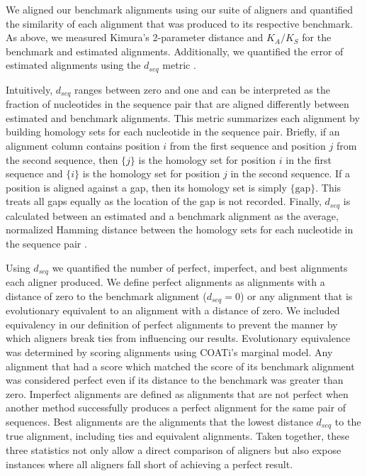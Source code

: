 \documentclass[12pt,letterpaper]{article}
\begin{document}
We aligned our benchmark alignments using our suite of aligners and quantified the similarity of each alignment that was produced to its respective benchmark. As above, we measured Kimura's 2-parameter distance \citep{kimura1980simple} and $K_A/K_S$ \citep{ka_ks_li_1993} for the benchmark and estimated alignments. Additionally, we quantified the error of estimated alignments using the $d_{seq}$ metric \citep{metrics_blackburne_whelan_2011}.

Intuitively, $d_{seq}$ ranges between zero and one and can be interpreted as the fraction of nucleotides in the sequence pair that are aligned differently between estimated and benchmark alignments. This metric summarizes each alignment by building homology sets for each nucleotide in the sequence pair. Briefly, if an alignment column contains position $i$ from the first sequence and position $j$ from the second sequence, then $\{j\}$ is the homology set for position $i$ in the first sequence and $\{i\}$ is the homology set for position $j$ in the second sequence. If a position is aligned against a gap, then its homology set is simply $\{\text{gap}\}$. This treats all gaps equally as the location of the gap is not recorded. Finally, $d_{seq}$ is calculated  between an estimated and a benchmark alignment as the average, normalized Hamming distance between the homology sets for each nucleotide in the sequence pair \citep{metrics_blackburne_whelan_2011}.

Using $d_{seq}$ we quantified the number of perfect, imperfect, and best alignments each aligner produced. We define perfect alignments as alignments with a distance of zero to the benchmark alignment ($d_{seq} = 0$) or any alignment that is evolutionary equivalent to an alignment with a distance of zero. We included equivalency in our definition of perfect alignments to prevent the manner by which aligners break ties from influencing our results. Evolutionary equivalence was determined by scoring alignments using COATi's marginal model. Any alignment that had a score which matched the score of its benchmark alignment was considered perfect even if its distance to the benchmark was greater than zero.
%
Imperfect alignments are defined as alignments that are not perfect when another method successfully produces a perfect alignment for the same pair of sequences.
%
Best alignments are the alignments that the lowest distance $d_{seq}$ to the true alignment, including ties and equivalent alignments.
%
Taken together, these three statistics not only allow a direct comparison of aligners but also expose instances where all aligners fall short of achieving a perfect result.
\end{document}
